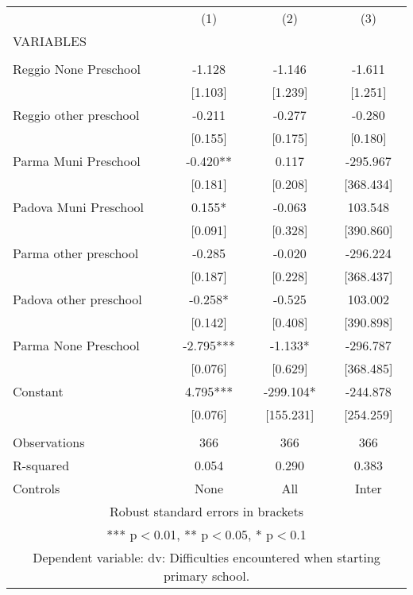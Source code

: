 \begin{tabular}{lccc} \hline
 & (1) & (2) & (3) \\
VARIABLES &  &  &  \\ \hline
 &  &  &  \\
Reggio None Preschool & -1.128 & -1.146 & -1.611 \\
 & [1.103] & [1.239] & [1.251] \\
Reggio other preschool & -0.211 & -0.277 & -0.280 \\
 & [0.155] & [0.175] & [0.180] \\
Parma Muni Preschool & -0.420** & 0.117 & -295.967 \\
 & [0.181] & [0.208] & [368.434] \\
Padova Muni Preschool & 0.155* & -0.063 & 103.548 \\
 & [0.091] & [0.328] & [390.860] \\
Parma other preschool & -0.285 & -0.020 & -296.224 \\
 & [0.187] & [0.228] & [368.437] \\
Padova other preschool & -0.258* & -0.525 & 103.002 \\
 & [0.142] & [0.408] & [390.898] \\
Parma None Preschool & -2.795*** & -1.133* & -296.787 \\
 & [0.076] & [0.629] & [368.485] \\
Constant & 4.795*** & -299.104* & -244.878 \\
 & [0.076] & [155.231] & [254.259] \\
 &  &  &  \\
Observations & 366 & 366 & 366 \\
R-squared & 0.054 & 0.290 & 0.383 \\
 Controls & None & All & Inter \\ \hline
\multicolumn{4}{c}{ Robust standard errors in brackets} \\
\multicolumn{4}{c}{ *** p$<$0.01, ** p$<$0.05, * p$<$0.1} \\
\multicolumn{4}{c}{ Dependent variable: dv: Difficulties encountered when starting primary school.} \\
\end{tabular}
